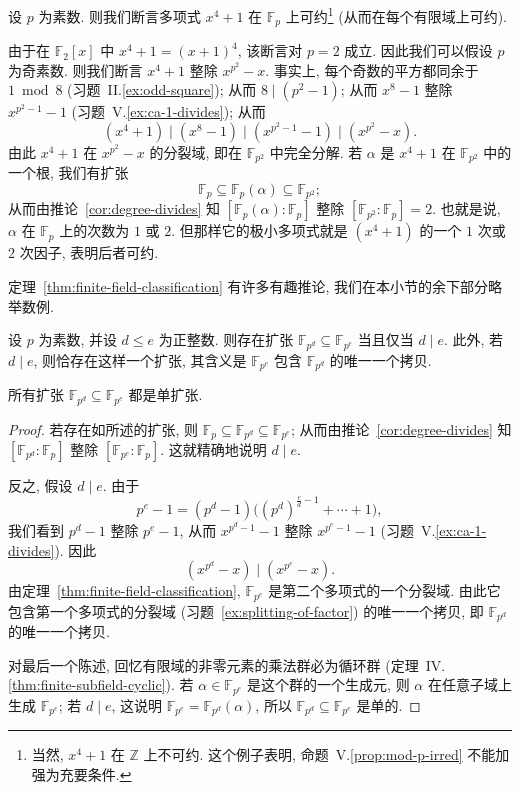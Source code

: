 \begin{example}\label{ex:xp1-red}
设 $p$ 为素数. 则我们断言多项式 $x^4+1$ 在 $\mathbb{F}_p$ 上可约\footnote{当然, $x^4+1$ 在 $\mathbb Z$ 上不可约. 这个例子表明, 命题~V.\ref{prop:mod-p-irred} 不能加强为充要条件.} (从而在每个有限域上可约).

由于在 $\mathbb{F}_2[x]$ 中 $x^4+1=(x+1)^4$, 该断言对 $p=2$ 成立. 因此我们可以假设 $p$ 为奇素数. 则我们断言 $x^4+1$ 整除 $x^{p^2}-x$. 事实上, 每个奇数的平方都同余于 $1\bmod 8$ (习题~II.\ref{ex:odd-square}); 从而 $8\mid(p^2-1)$; 从而 $x^8-1$ 整除 $x^{p^2-1}-1$ (习题~V.\ref{ex:ca-1-divides}); 从而
\[
(x^4+1)\mid(x^8-1)\mid(x^{p^2-1}-1)\mid(x^{p^2}-x).
\]
由此 $x^4+1$ 在 $x^{p^2}-x$ 的分裂域, 即在 $\mathbb{F}_{p^2}$ 中完全分解. 若 $\alpha$ 是 $x^4+1$ 在 $\mathbb{F}_{p^2}$ 中的一个根, 我们有扩张
\[
\mathbb{F}_p\subseteq\mathbb{F}_p(\alpha)\subseteq\mathbb{F}_{p^2};
\]
从而由推论~\ref{cor:degree-divides} 知 $[\mathbb{F}_p(\alpha):\mathbb{F}_p]$ 整除 $[\mathbb{F}_{p^2}:\mathbb{F}_p]=2$. 也就是说, $\alpha$ 在 $\mathbb{F}_p$ 上的次数为 $1$ 或 $2$. 但那样它的极小多项式就是 $(x^4+1)$ 的一个 $1$ 次或 $2$ 次因子, 表明后者可约.
\end{example}

定理~\ref{thm:finite-field-classification} 有许多有趣推论, 我们在本小节的余下部分略举数例.

\begin{corollary}\label{cor:finite-field-extension}
设 $p$ 为素数, 并设 $d\leq e$ 为正整数. 则存在扩张 $\mathbb{F}_{p^d}\subseteq\mathbb{F}_{p^e}$ 当且仅当 $d\mid e$. 此外, 若 $d\mid e$, 则恰存在这样一个扩张, 其含义是 $\mathbb{F}_{p^e}$ 包含 $\mathbb{F}_{p^d}$ 的唯一一个拷贝.

所有扩张 $\mathbb{F}_{p^d}\subseteq\mathbb{F}_{p^e}$ 都是单扩张.
\end{corollary}

\begin{proof}
若存在如所述的扩张, 则 $\mathbb{F}_p\subseteq\mathbb{F}_{p^d}\subseteq\mathbb{F}_{p^e}$; 从而由推论~\ref{cor:degree-divides} 知 $[\mathbb{F}_{p^d}:\mathbb{F}_p]$ 整除 $[\mathbb{F}_{p^e}:\mathbb{F}_p]$. 这就精确地说明 $d\mid e$.

反之, 假设 $d\mid e$. 由于
\[
p^e-1=(p^d-1)\bigl((p^d)^{\frac{e}{d}-1}+\cdots+1\bigr),
\]
我们看到 $p^d-1$ 整除 $p^e-1$, 从而 $x^{p^d-1}-1$ 整除 $x^{p^e-1}-1$ (习题~V.\ref{ex:ca-1-divides}). 因此
\[
(x^{p^d}-x)\mid(x^{p^e}-x).
\]
由定理~\ref{thm:finite-field-classification}, $\mathbb{F}_{p^e}$ 是第二个多项式的一个分裂域. 由此它包含第一个多项式的分裂域 (习题~\ref{ex:splitting-of-factor}) 的唯一一个拷贝, 即 $\mathbb{F}_{p^d}$ 的唯一一个拷贝.

对最后一个陈述, 回忆有限域的非零元素的乘法群必为循环群 (定理~IV.\ref{thm:finite-subfield-cyclic}). 若 $\alpha\in\mathbb{F}_{p^e}$ 是这个群的一个生成元, 则 $\alpha$ 在任意子域上生成 $\mathbb{F}_{p^e}$; 若 $d\mid e$, 这说明 $\mathbb{F}_{p^e}=\mathbb{F}_{p^d}(\alpha)$, 所以 $\mathbb{F}_{p^d}\subseteq\mathbb{F}_{p^e}$ 是单的.
\end{proof}


